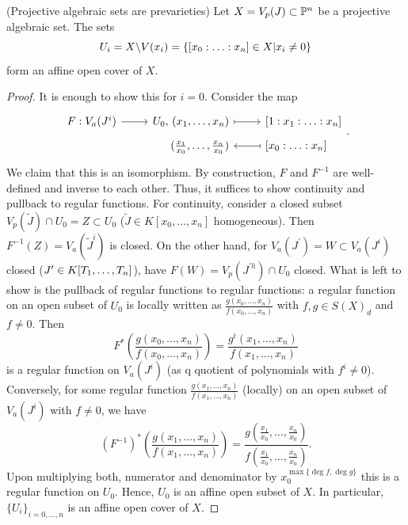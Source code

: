 \documentclass[a4paper,11pt]{article}
\begin{document}
			\begin{prop}\label{prop-projsets}(Projective algebraic sets are prevarieties)
				Let $X=V_p(J)\subset\P^n$ be a projective algebraic set. The sets 
				\begin{equation*}
					U_i=X\backslash V(x_i)=\{\x{n}\in X|x_i\neq0\}
				\end{equation*}
				form an affine open cover of $X$.
			\end{prop}
			\begin{proof}
				It is enough to show this for $i=0$. Consider the map
				\begin{equation*}
					\begin{tikzcd}[row sep=tiny,
						/tikz/column 2/.append style={nodes={anchor=base east}},
						/tikz/column 3/.append style={nodes={anchor=base west}}]
						F:V_a(J^i)\ar[r] & U_0,\, (x_1,\dots,x_n)\ar[r,mapsto] & {[1:x_1:\ldots:x_n]}\\
						& (\frac{x_1}{x_0},\dots,\frac{x_n}{x_0}) & \ar[l,mapsto]\x{n}
					\end{tikzcd}.
				\end{equation*}
				We claim that this is an isomorphism. By construction, $F$ and $F^{-1}$ are well-defined and inverse to each other. Thus, it suffices to show continuity and pullback to regular functions. For continuity, consider a closed subset $V_p(\tilde{J})\cap U_0=Z\subset U_0$ ($\tilde{J}\in K[x_0,\dots,x_n]$ homogeneous). Then $F^{-1}(Z)=V_a(\tilde{J}^i)$ is closed. On the other hand, for $V_a(J^\prime)=W\subset V_a(J^i)$ closed ($J^\prime\in\K$), have $F(W)=V_p(J^{\prime h})\cap U_0$ closed. What is left to show is the pullback of regular functions to regular functions: a regular function on an open subset of $U_0$ is locally written as $\frac{g(x_0,\dots,x_n)}{f(x_0,\dots,x_n)}$ with $f,g\in S(X)_d$ and $f\neq0$. Then 
				\begin{equation*}
					F^\ast\left( \frac{g(x_0,\dots,x_n)}{f(x_0,\dots,x_n)} \right)=\frac{g^i(x_1,\dots,x_n)}{f(x_1,\dots,x_n)}
				\end{equation*}
				is a regular function on $V_a(J^i)$ (as q quotient of polynomials with $f^i\neq0$). Conversely, for some regular function $\frac{g(x_1,\dots,x_n)}{f(x_1,\dots,x_n)}$ (locally) on an open subset of $V_a(J^i)$ with $f\neq0$, we have
				\begin{equation*}
					(F^{-1})^\ast\left(\frac{g(x_1,\dots,x_n)}{f(x_1,\dots,x_n)}\right)=\frac{g(\frac{x_1}{x_0},\dots,\frac{x_n}{x_0})}{f(\frac{x_1}{x_0},\dots,\frac{x_n}{x_0})}.
				\end{equation*}
				Upon multiplying both, numerator and denominator by $x_0^{\max\{\deg f,\deg g\}}$ this is a regular function on $U_0$. Hence, $U_0$ is an affine open subset of $X$. In particular, $\{U_i\}_{i=0,\dots,n}$ is an affine open cover of $X$.
			\end{proof}
\end{document}
